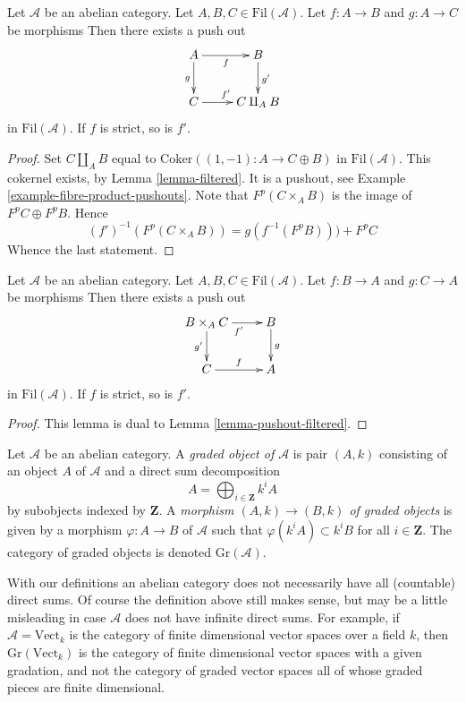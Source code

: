 \begin{lemma}
\label{lemma-pushout-filtered}
Let $\mathcal{A}$ be an abelian category.
Let $A, B, C \in \text{Fil}(\mathcal{A})$.
Let $f : A \to B$ and $g : A \to C$ be morphisms
Then there exists a push out
$$
\xymatrix{
A \ar[r]_f \ar[d]_g & B \ar[d]^{g'} \\
C \ar[r]^{f'} & C \amalg_A B
}
$$
in $\text{Fil}(\mathcal{A})$. If $f$ is strict, so is $f'$.
\end{lemma}

\begin{proof}
Set $C \amalg_A B$ equal to $\text{Coker}((1, -1) : A \to C \oplus B)$
in $\text{Fil}(\mathcal{A})$. This cokernel exists, by
Lemma \ref{lemma-filtered}.
It is a pushout, see
Example \ref{example-fibre-product-pushouts}.
Note that $F^p(C \times_A B)$ is the image of $F^pC \oplus F^pB$.
Hence
$$
(f')^{-1}(F^p(C \times_A B)) = g(f^{-1}(F^pB))) + F^pC
$$
Whence the last statement.
\end{proof}

\begin{lemma}
\label{lemma-fibre-product-filtered}
Let $\mathcal{A}$ be an abelian category.
Let $A, B, C \in \text{Fil}(\mathcal{A})$.
Let $f : B \to A$ and $g : C \to A$ be morphisms
Then there exists a push out
$$
\xymatrix{
B \times_A C \ar[r]_{f'} \ar[d]_{g'} & B \ar[d]^g \\
C \ar[r]^f & A
}
$$
in $\text{Fil}(\mathcal{A})$. If $f$ is strict, so is $f'$.
\end{lemma}

\begin{proof}
This lemma is dual to
Lemma \ref{lemma-pushout-filtered}.
\end{proof}

\begin{definition}
\label{definition-graded}
Let $\mathcal{A}$ be an abelian category.
A {\it graded object of $\mathcal{A}$} is
pair $(A, k)$ consisting of an object $A$ of $\mathcal{A}$
and a direct sum decomposition
$$
A = \bigoplus\nolimits_{i \in \mathbf{Z}} k^iA
$$
by subobjects indexed by $\mathbf{Z}$.
A {\it morphism $(A, k) \to (B, k)$ of graded objects}
is given by a morphism $\varphi : A \to B$ of $\mathcal{A}$
such that $\varphi(k^iA) \subset k^iB$ for all $i \in \mathbf{Z}$.
The category of graded objects is denoted $\text{Gr}(\mathcal{A})$.
\end{definition}

\noindent
With our definitions an abelian category does not necessarily have
all (countable) direct sums. Of course the definition above still
makes sense, but may be a little misleading in case $\mathcal{A}$
does not have infinite direct sums. For example, if
$\mathcal{A} = \text{Vect}_k$ is the category of finite dimensional vector
spaces over a field $k$, then $\text{Gr}(\text{Vect}_k)$ is the category
of finite dimensional vector spaces with a given gradation,
and not the category of graded vector spaces all of whose graded
pieces are finite dimensional.

